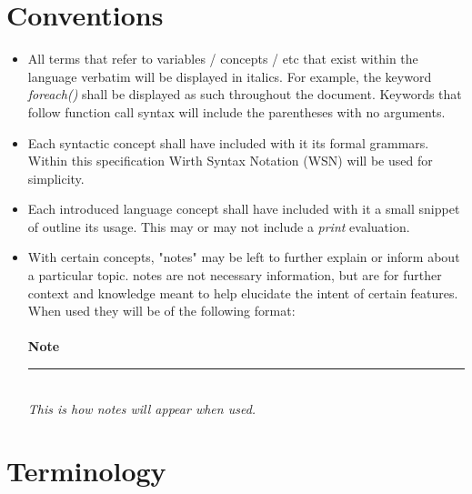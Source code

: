 \documentclass[12pt,letterpaper]{report}
\newcommand{\noteline}{\noindent\textbf{Note}\\\noindent\rule{5cm}{0.4pt}\\}
\begin{document}
\section{Conventions}\label{Conventions}
\begin{itemize}
  \item All terms that refer to variables / concepts / etc that exist within the language verbatim will 
  be displayed in italics. For example, the keyword \textit{foreach()} shall be displayed as such 
  throughout the document. Keywords that follow function call syntax will include the parentheses with 
  no arguments.
  
  \item Each syntactic concept shall have included with it its formal grammars. Within this specification 
  Wirth Syntax Notation (WSN) will be used for simplicity.

  \item Each introduced language concept shall have included with it a small snippet of outline its usage. This 
  may or may not include a \textit{print} evaluation.

  

  \item With certain concepts, "notes" may be left to further explain or inform about a particular topic. notes are 
        not necessary information, but are for further context and knowledge meant to help elucidate the 
        intent of certain features. When used they will be of the following format:\\\\
  \noteline
  \textit{This is how notes will appear when used.}

\end{itemize}
\section{Terminology}\label{Terminology}
\end{document}
